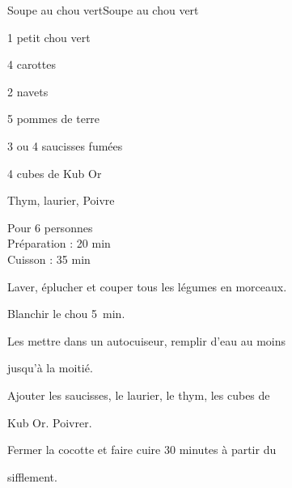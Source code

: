 \begin{recette}{Soupe au chou vert}{Soupe au chou vert}

\begin{ingredients}
1 petit chou vert\par
4 carottes\par
2 navets\par
5 pommes de terre\par
3 ou 4 saucisses fumées\par
4 cubes de Kub Or\par
Thym, laurier, Poivre\par
\end{ingredients}

\begin{infos}
Pour 6 personnes\\
Préparation : 20 min\\
Cuisson : 35 min\\
\end{infos}

\begin{etapes}
\item Laver, éplucher et couper tous les légumes en morceaux.
\item Blanchir le chou 5~min.
\item Les mettre dans un autocuiseur, remplir d'eau au moins
\item jusqu'à la moitié.
\item Ajouter les saucisses, le laurier, le thym, les cubes de
\item Kub Or. Poivrer.
\item Fermer la cocotte et faire cuire 30 minutes à partir du
\item sifflement.
\end{etapes}

\end{recette}